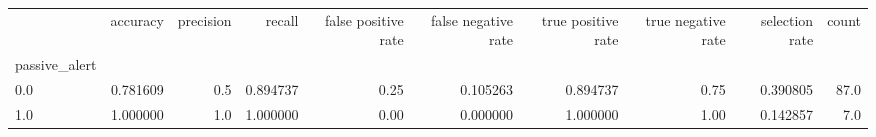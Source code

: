 \begin{tabular}{lrrrrrrrrr}
\toprule
{} &  accuracy &  precision &    recall &  false positive rate &  false negative rate &  true positive rate &  true negative rate &  selection rate &  count \\
passive\_alert &           &            &           &                      &                      &                     &                     &                 &        \\
\midrule
0.0           &  0.781609 &        0.5 &  0.894737 &                 0.25 &             0.105263 &            0.894737 &                0.75 &        0.390805 &   87.0 \\
1.0           &  1.000000 &        1.0 &  1.000000 &                 0.00 &             0.000000 &            1.000000 &                1.00 &        0.142857 &    7.0 \\
\bottomrule
\end{tabular}
